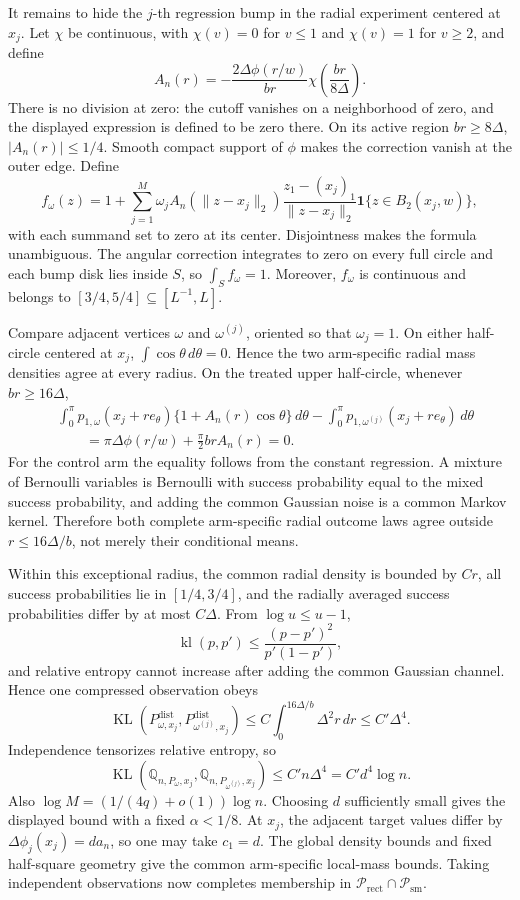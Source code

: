 It remains to hide the \(j\)-th regression bump in the radial experiment centered at \(x_j\).  Let \(\chi\) be continuous, with \(\chi(v)=0\) for \(v\leq1\) and \(\chi(v)=1\) for \(v\geq2\), and define
\[
 A_n(r)=-\frac{2\Delta\phi(r/w)}{br}
 \chi\!\left(\frac{br}{8\Delta}\right).
\]
There is no division at zero: the cutoff vanishes on a neighborhood of zero, and the displayed expression is defined to be zero there.  On its active region \(br\geq8\Delta\), \(|A_n(r)|\leq1/4\).  Smooth compact support of \(\phi\) makes the correction vanish at the outer edge.  Define
\[
 f_\omega(z)=1+\sum_{j=1}^M\omega_j A_n(\lVert z-x_j\rVert_2)
 \frac{z_1-(x_j)_1}{\lVert z-x_j\rVert_2}
 \mathbf 1\{z\in B_2(x_j,w)\},
\]
with each summand set to zero at its center.  Disjointness makes the formula unambiguous.  The angular correction integrates to zero on every full circle and each bump disk lies inside \(S\), so \(\int_S f_\omega=1\).  Moreover, \(f_\omega\) is continuous and belongs to \([3/4,5/4]\subseteq[L^{-1},L]\).

Compare adjacent vertices \(\omega\) and \(\omega^{(j)}\), oriented so that \(\omega_j=1\).  On either half-circle centered at \(x_j\), \(\int\cos\theta\,d\theta=0\).  Hence the two arm-specific radial mass densities agree at every radius.  On the treated upper half-circle, whenever \(br\geq16\Delta\),
\[
\begin{aligned}
 &\int_0^\pi p_{1,\omega}(x_j+r e_\theta)
       \{1+A_n(r)\cos\theta\}\,d\theta
 -\int_0^\pi p_{1,\omega^{(j)}}(x_j+r e_\theta)\,d\theta\\
 &\qquad=\pi\Delta\phi(r/w)+\frac\pi2brA_n(r)=0.
\end{aligned}
\]
For the control arm the equality follows from the constant regression.  A mixture of Bernoulli variables is Bernoulli with success probability equal to the mixed success probability, and adding the common Gaussian noise is a common Markov kernel.  Therefore both complete arm-specific radial outcome laws agree outside \(r\leq16\Delta/b\), not merely their conditional means.

Within this exceptional radius, the common radial density is bounded by \(Cr\), all success probabilities lie in \([1/4,3/4]\), and the radially averaged success probabilities differ by at most \(C\Delta\).  From \(\log u\leq u-1\),
\[
 \operatorname{kl}(p,p')\leq\frac{(p-p')^2}{p'(1-p')},
\]
and relative entropy cannot increase after adding the common Gaussian channel.  Hence one compressed observation obeys
\[
 \operatorname{KL}(P^{\mathrm{dist}}_{\omega,x_j},
 P^{\mathrm{dist}}_{\omega^{(j)},x_j})
 \leq C\int_0^{16\Delta/b}\Delta^2r\,dr
 \leq C'\Delta^4.
\]
Independence tensorizes relative entropy, so
\[
 \operatorname{KL}(\mathbb Q_{n,P_\omega,x_j},
 \mathbb Q_{n,P_{\omega^{(j)}},x_j})
 \leq C' n\Delta^4=C'd^4\log n.
\]
Also \(\log M=(1/(4q)+o(1))\log n\).  Choosing \(d\) sufficiently small gives the displayed bound with a fixed \(\alpha<1/8\).  At \(x_j\), the adjacent target values differ by \(\Delta\phi_j(x_j)=d a_n\), so one may take \(c_1=d\).  The global density bounds and fixed half-square geometry give the common arm-specific local-mass bounds.  Taking independent observations now completes membership in \(\mathcal P_{\mathrm{rect}}\cap\mathcal P_{\mathrm{sm}}\).


